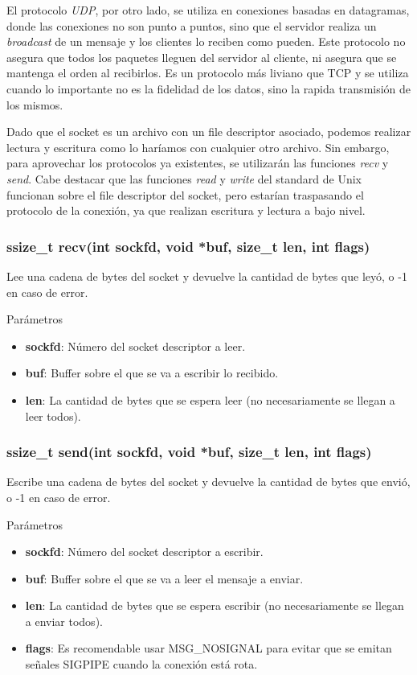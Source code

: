 \documentclass[a4paper, twoside]{article}
\begin{document}
El protocolo \emph{UDP}, por otro lado, se utiliza en conexiones basadas en datagramas, donde las conexiones no son punto a puntos, sino que el servidor realiza un \emph{broadcast} de un mensaje y los clientes lo reciben como pueden. Este protocolo no asegura que todos los paquetes lleguen del servidor al cliente, ni asegura que se mantenga el orden al recibirlos. Es un protocolo más liviano que TCP y se utiliza cuando lo importante no es la fidelidad de los datos, sino la rapida transmisión de los mismos.

Dado que el socket es un archivo con un file descriptor asociado, podemos realizar lectura y escritura como lo haríamos con cualquier otro archivo. Sin embargo, para aprovechar los protocolos ya existentes, se utilizarán las funciones \emph{recv} y \emph{send}. Cabe destacar que las funciones \emph{read} y \emph{write} del standard de Unix funcionan sobre el file descriptor del socket, pero estarían traspasando el protocolo de la conexión, ya que realizan escritura y lectura a bajo nivel.

\subsubsection{ssize\_t recv(int sockfd, void *buf, size\_t len, int flags)}
Lee una cadena de bytes del socket y devuelve la cantidad de bytes que leyó, o -1 en caso de error.

\begin{parametros*}{Parámetros}
	\begin{itemize}
		\item \textbf{sockfd}: Número del socket descriptor a leer.
		\item \textbf{buf}: Buffer sobre el que se va a escribir lo recibido.
		\item \textbf{len}: La cantidad de bytes que se espera leer (no necesariamente se llegan a leer todos).
	\end{itemize}
\end{parametros*}

\subsubsection{ssize\_t send(int sockfd, void *buf, size\_t len, int flags)}
Escribe una cadena de bytes del socket y devuelve la cantidad de bytes que envió, o -1 en caso de error.

\begin{parametros*}{Parámetros}
	\begin{itemize}
		\item \textbf{sockfd}: Número del socket descriptor a escribir.
		\item \textbf{buf}: Buffer sobre el que se va a leer el mensaje a enviar.
		\item \textbf{len}: La cantidad de bytes que se espera escribir (no necesariamente se llegan a enviar todos).
		\item \textbf{flags}: Es recomendable usar MSG\_NOSIGNAL para evitar que se emitan señales SIGPIPE cuando la conexión está rota.
	\end{itemize}
\end{parametros*}
\end{document}
